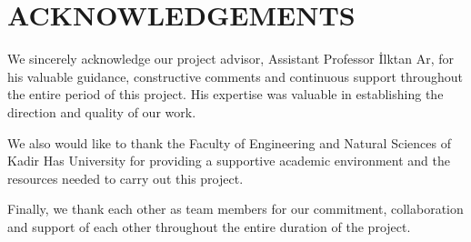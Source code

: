 \section*{ACKNOWLEDGEMENTS}

We sincerely acknowledge our project advisor, Assistant Professor İlktan Ar, for his valuable guidance, constructive comments and continuous support throughout the entire period of this project. His expertise was valuable in establishing the direction and quality of our work.

We also would like to thank the Faculty of Engineering and Natural Sciences of Kadir Has University for providing a supportive academic environment and the resources needed to carry out this project.

Finally, we thank each other as team members for our commitment, collaboration and support of each other throughout the entire duration of the project.

\clearpage